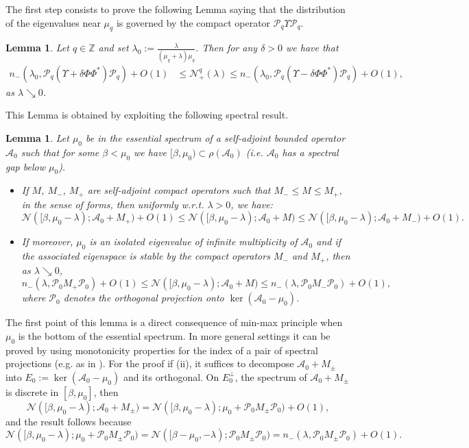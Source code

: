\documentclass[11pt,a4paper,reqno,oneside]{amsproc}
\def \zz {{\mathbb Z}}
\numberwithin{equation}{section}
\newtheorem{lemma}[definition]{Lemma}
\begin{document}
The first step consists to prove the following Lemma saying that the distribution of the eigenvalues near $\mu_q$ is governed by the compact operator $\mathcal P_q\Upsilon  \mathcal P_q$.


\begin{lemma}\label{le1} Let  $q\in \zz$  and set $\lambda_0:=\frac{\lambda}{(\mu_q+\lambda)\mu_q}$. Then  
for any $\delta>0$ we have that 
	\begin{align*}
	n_-(\lambda_0,\mathcal P_q(\Upsilon + \delta \Phi \Phi^{*})\mathcal P_q)+O(1)&\leq \mathcal N_+^q(\lambda)\leq  n_-(\lambda_0,\mathcal P_q(\Upsilon - \delta \Phi \Phi^{*})\mathcal P_q)+O(1),
\end{align*}
as $\lambda \searrow 0$.
\end{lemma}

This Lemma is obtained by exploiting the following spectral result.

\begin{lemma}\label{le1b} Let $\mu_0$ be in the essential spectrum of a self-adjoint bounded operator $\mathcal A_0$ such that for some $\beta< \mu_0$ we have $[\beta, \mu_0) \subset \rho(\mathcal A_0)$ (i.e. $\mathcal A_0$ has a spectral gap below $\mu_0$). 
\begin{itemize}
     \item[(i)] If $M$, $M_-$, $M_+$ are self-adjoint compact operators such that
    $M_- \leq M \leq M_+$, in the sense of forms, then uniformly w.r.t. $\lambda >0$, we have:
    \[
  \mathcal N([\beta, \mu_0 - \lambda); \mathcal A_0 +M_+) + O(1)  \leq \mathcal N([\beta, \mu_0 - \lambda); \mathcal A_0 +M) \leq \mathcal N([\beta, \mu_0 - \lambda); \mathcal A_0 +M_-) + O(1).
    \]
    \item[(ii)] If moreover, $\mu_0$ is an isolated eigenvalue of infinite multiplicity of $\mathcal A_0$ and if the associated eigenspace is stable by the compact operators $M_-$ and $M_+$, then as $\lambda \searrow 0$, 
    \[
  n_-(\lambda, \mathcal P_0 M_+ \mathcal P_0) + O(1)  \leq \mathcal N([\beta, \mu_0 - \lambda); \mathcal A_0 +M) \leq n_-(\lambda, \mathcal P_0 M_- \mathcal P_0) + O(1),
    \]
    where $\mathcal P_0$ denotes the orthogonal projection onto $\ker(\mathcal A_0 - \mu_0)$.
\end{itemize}

\end{lemma}
The first point of this lemma is a direct consequence of min-max principle when $\mu_0$ is the bottom of the essential spectrum. In more general settings it can be proved by using monotonicity properties for the index of a pair of spectral projections  (e.g. as in \cite[Section 4.1]{BM}). For the proof if (ii), it suffices to decompose $\mathcal A_0 +M_\pm$ into $E_0:=\ker(\mathcal A_0 -\mu_0)$ and its orthogonal. On $E_0^\perp$, the spectrum of $\mathcal A_0 +M_\pm$ is discrete in $[\beta, \mu_0]$, then 
\[ \mathcal N([\beta, \mu_0 - \lambda); \mathcal A_0 + M_\pm) =
 \mathcal N([\beta, \mu_0 - \lambda);  \mu_0 + \mathcal P_0 M_\pm \mathcal P_0 ) + O(1),
\]
and the result follows because 
\[
\mathcal N([\beta, \mu_0 - \lambda);  \mu_0 + \mathcal P_0 M_\pm \mathcal P_0 ) = \mathcal N([\beta-\mu_0, - \lambda);  \mathcal P_0 M_\pm \mathcal P_0 ) = n_-(\lambda, \mathcal P_0 M_\pm \mathcal P_0) + O(1).
\]
\end{document}
